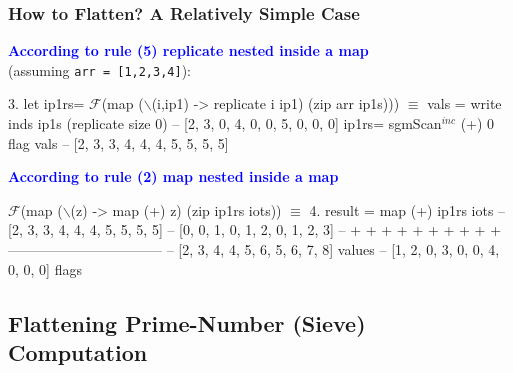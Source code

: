 \documentclass{beamer}
\newcommand{\blue}[1]{\textcolor{Blue}{{#1}}}
\renewcommand{\emph}[1]{\textcolor{structure}{#1}}
\newcommand{\emp}[1]{\textcolor{DikuRed}{ #1}}
\newcommand{\mymath}[1]{$ #1 $}
\newcommand{\myindu}[1]{^{#1}}
\begin{document}
\begin{frame}[fragile,t]
  \frametitle{How to Flatten? A Relatively Simple Case}

\blue{\bf According to rule (5) replicate nested inside a map}\\
(assuming {\tt arr = [1,2,3,4]}):

\bigskip

\begin{colorcode}
3. let ip1rs= \mymath{\mathcal{F}}(map (\mymath{\backslash}(i,ip1) -> replicate i ip1) (zip arr ip1s)))
\mymath{\equiv}
vals = write inds  ip1s (replicate size 0) -- [2, 3, 0, 4, 0, 0, 5, 0, 0, 0]
ip1rs= sgmScan\mymath{\myindu{inc}} (+) 0 flag \emp{vals}           \emph{-- [2, 3, 3, 4, 4, 4, 5, 5, 5, 5]}
\end{colorcode}

\bigskip

\blue{\bf According to rule (2) map nested inside a map}\\

\bigskip

\begin{colorcode}
\mymath{\mathcal{F}}(map (\mymath{\backslash}(z) -> map (+) z) (zip ip1rs iots))
\mymath{\equiv}
4. result = map (+) ip1rs iots
-- [2, 3, 3, 4, 4, 4, 5, 5, 5, 5]
-- [0, 0, 1, 0, 1, 2, 0, 1, 2, 3]
--  +  +  +  +  +  +  +  +  +  +
---------------------------------
\emph{-- [2, 3, 4, 4, 5, 6, 5, 6, 7, 8]} \emp{values}
\emph{-- [1, 2, 0, 3, 0, 0, 4, 0, 0, 0]} \emp{flags}
\end{colorcode}

\end{frame}




\subsection{Flattening Prime-Number (Sieve) Computation}

\begin{frame}[fragile]
	\tableofcontents[currentsubsection]
\end{frame}
\end{document}
